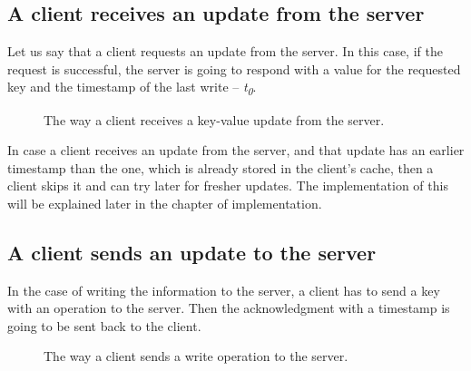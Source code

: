 \subsection{A client receives an update from the server}

Let us say that a client requests an update from the server. In this case, if the request is successful, the server is going to respond with a value for the requested key and the timestamp of the last write -- \textit{t\textsubscript{0}}.

\begin{figure}[!htb]
    \setlength{\fboxsep}{4pt}%
    \setlength{\fboxrule}{1pt}%
    \caption{The way a client receives a key-value update from the server.}
    \label{fig:design2}
\end{figure}

In case a client receives an update from the server, and that update has an earlier timestamp than the one, which is already stored in the client's cache, then a client skips it and can try later for fresher updates. The implementation of this will be explained later in the chapter of implementation.

\subsection{A client sends an update to the server}

In the case of writing the information to the server, a client has to send a key with an operation to the server. Then the acknowledgment with a timestamp is going to be sent back to the client.

\begin{figure}[!htb]
    \setlength{\fboxsep}{4pt}%
    \setlength{\fboxrule}{1pt}%
    \caption{The way a client sends a write operation to the server.}
    \label{fig:design3}
\end{figure}

